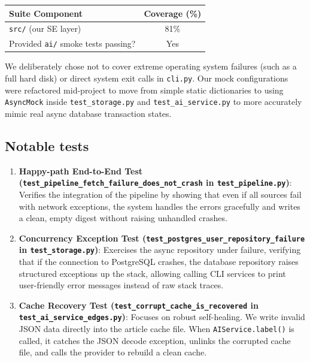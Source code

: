 \documentclass[11pt,a4paper]{article}
\begin{document}
\vspace{0.3cm} 
\begin{table}[h]
\centering
\begin{tabular}{lc}
\toprule
\textbf{Suite Component} & \textbf{Coverage (\%)} \\
\midrule
\texttt{src/} (our SE layer) & 81\% \\
Provided \texttt{ai/} smoke tests passing? & Yes \\
\bottomrule
\end{tabular}
\end{table}
\vspace{0.2cm}

We deliberately chose not to cover extreme operating system failures (such as a full hard disk) or direct system exit calls in \texttt{cli.py}. Our mock configurations were refactored mid-project to move from simple static dictionaries to using \texttt{AsyncMock} inside \texttt{test\_storage.py} and \texttt{test\_ai\_service.py} to more accurately mimic real async database transaction states.

\subsection{Notable tests}

\begin{enumerate}
    \item \textbf{Happy-path End-to-End Test (\texttt{test\_pipeline\_fetch\_failure\_does\_not\_crash} in \texttt{test\_pipeline.py})}: Verifies the integration of the pipeline by showing that even if all sources fail with network exceptions, the system handles the errors gracefully and writes a clean, empty digest without raising unhandled crashes.
    \item \textbf{Concurrency Exception Test (\texttt{test\_postgres\_user\_repository\_failure} in \texttt{test\_storage.py})}: Exercises the async repository under failure, verifying that if the connection to PostgreSQL crashes, the database repository raises structured exceptions up the stack, allowing calling CLI services to print user-friendly error messages instead of raw stack traces.
    \item \textbf{Cache Recovery Test (\texttt{test\_corrupt\_cache\_is\_recovered} in \texttt{test\_ai\_service\_edges.py})}: Focuses on robust self-healing. We write invalid JSON data directly into the article cache file. When \texttt{AIService.label()} is called, it catches the JSON decode exception, unlinks the corrupted cache file, and calls the provider to rebuild a clean cache.
\end{enumerate}
\end{document}
